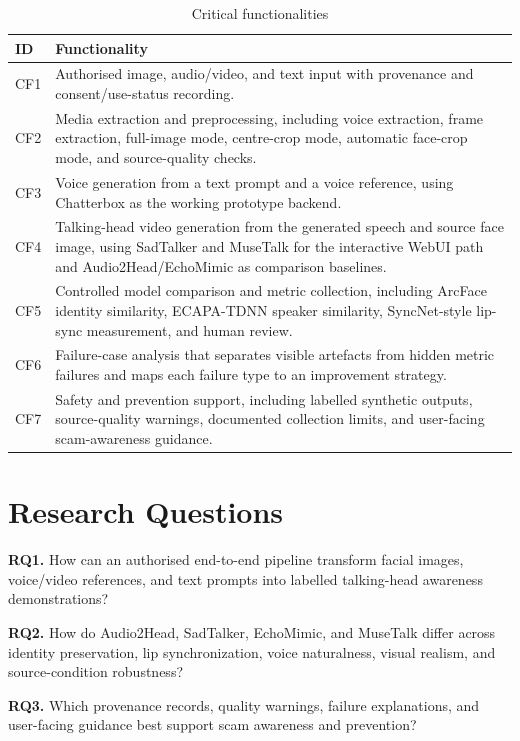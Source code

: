\documentclass[10pt,conference]{IEEEtran}
\begin{document}
\begin{table}[H]
\caption{Critical functionalities}
\label{tab:cf}
\centering
\scriptsize
\begin{tabular}{@{}p{}p{}@{}}
\toprule
\textbf{ID} & \textbf{Functionality} \\
\midrule
CF1 & Authorised image, audio/video, and text input with provenance and consent/use-status recording. \\
CF2 & Media extraction and preprocessing, including voice extraction, frame extraction, full-image mode, centre-crop mode, automatic face-crop mode, and source-quality checks. \\
CF3 & Voice generation from a text prompt and a voice reference, using Chatterbox as the working prototype backend. \\
CF4 & Talking-head video generation from the generated speech and source face image, using SadTalker and MuseTalk for the interactive WebUI path and Audio2Head/EchoMimic as comparison baselines. \\
CF5 & Controlled model comparison and metric collection, including ArcFace identity similarity, ECAPA-TDNN speaker similarity, SyncNet-style lip-sync measurement, and human review. \\
CF6 & Failure-case analysis that separates visible artefacts from hidden metric failures and maps each failure type to an improvement strategy. \\
CF7 & Safety and prevention support, including labelled synthetic outputs, source-quality warnings, documented collection limits, and user-facing scam-awareness guidance. \\
\bottomrule
\end{tabular}
\end{table}

\section{Research Questions}
\textbf{RQ1.} How can an authorised end-to-end pipeline transform facial images, voice/video references, and text prompts into labelled talking-head awareness demonstrations?

\textbf{RQ2.} How do Audio2Head, SadTalker, EchoMimic, and MuseTalk differ across identity preservation, lip synchronization, voice naturalness, visual realism, and source-condition robustness?

\textbf{RQ3.} Which provenance records, quality warnings, failure explanations, and user-facing guidance best support scam awareness and prevention?
\end{document}
